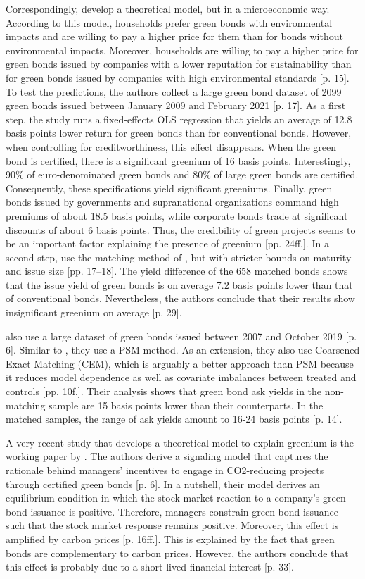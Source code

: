 Correspondingly, \citet{kapraun2021credibly} develop a theoretical model, but in a microeconomic way. According to this model, households prefer green bonds with environmental impacts and are willing to pay a higher price for them than for bonds without environmental impacts. Moreover, households are willing to pay a higher price for green bonds issued by companies with a lower reputation for sustainability than for green bonds issued by companies with high environmental standards [p. 15]. To test the predictions, the authors collect a large green bond dataset of 2099 green bonds issued between January 2009 and February 2021 [p. 17]. As a first step, the study runs a fixed-effects OLS regression that yields an average of 12.8 basis points lower return for green bonds than for conventional bonds. However, when controlling for creditworthiness, this effect disappears. When the green bond is certified, there is a significant greenium of 16 basis points. Interestingly, 90\% of euro-denominated green bonds and 80\% of large green bonds are certified. Consequently, these specifications yield significant greeniums. Finally, green bonds issued by governments and supranational organizations command high premiums of about 18.5 basis points, while corporate bonds trade at significant discounts of about 6 basis points. Thus, the credibility of green projects seems to be an important factor explaining the presence of greenium [pp. 24ff.]. In a second step, \citet{kapraun2021credibly} use the matching method of \citet{zerbib2017green}, but with stricter bounds on maturity and issue size [pp. 17--18]. The yield difference of the 658 matched bonds shows that the issue yield of green bonds is on average 7.2 basis points lower than that of conventional bonds. Nevertheless, the authors conclude that their results show insignificant greenium on average [p. 29].

\citet{loffler2021drivers} also use a large dataset of green bonds issued between 2007 and October 2019 [p. 6]. Similar to \citet{gianfrate2019green}, they use a PSM method. As an extension, they also use Coarsened Exact Matching (CEM), which is arguably a better approach than PSM because it reduces model dependence as well as covariate imbalances between treated and controls [pp. 10f.]. Their analysis shows that green bond ask yields in the non-matching sample are 15 basis points lower than their counterparts. In the matched samples, the range of ask yields amount to 16-24 basis points [p. 14]. 

A very recent study that develops a theoretical model to explain greenium is the working paper by \citet{daubanes2021firms}. The authors derive a signaling model that captures the rationale behind managers' incentives to engage in CO2-reducing projects through certified green bonds [p. 6]. In a nutshell, their model derives an equilibrium condition in which the stock market reaction to a company's green bond issuance is positive. Therefore, managers constrain green bond issuance such that the stock market response remains positive. Moreover, this effect is amplified by carbon prices [p. 16ff.]. This is explained by the fact that green bonds are complementary to carbon prices. However, the authors conclude that this effect is probably due to a short-lived financial interest [p. 33].

